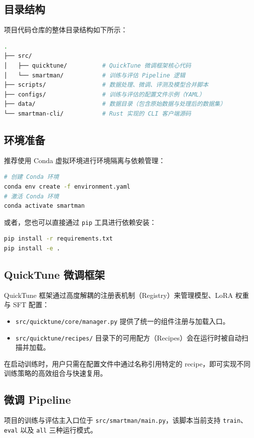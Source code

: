 \documentclass[UTF8,a4paper,12pt]{ctexart}
\begin{document}
\subsection{目录结构}
项目代码仓库的整体目录结构如下所示：
\newpage
\begin{lstlisting}[language=bash, numbers=none, caption=项目目录树结构]
.
├── src/
│   ├── quicktune/          # QuickTune 微调框架核心代码
│   └── smartman/           # 训练与评估 Pipeline 逻辑
├── scripts/                # 数据处理、微调、评测及模型合并脚本
├── configs/                # 训练与评估的配置文件示例（YAML）
├── data/                   # 数据目录（包含原始数据与处理后的数据集）
└── smartman-cli/           # Rust 实现的 CLI 客户端源码
\end{lstlisting}

\subsection{环境准备}
推荐使用 Conda 虚拟环境进行环境隔离与依赖管理：

\begin{lstlisting}[language=bash]
# 创建 Conda 环境
conda env create -f environment.yaml
# 激活 Conda 环境
conda activate smartman
\end{lstlisting}

或者，您也可以直接通过 \texttt{pip} 工具进行依赖安装：

\begin{lstlisting}[language=bash]
pip install -r requirements.txt
pip install -e .
\end{lstlisting}

\subsection{QuickTune 微调框架}
QuickTune 框架通过高度解耦的注册表机制（Registry）来管理模型、LoRA 权重与 SFT 配置：
\begin{itemize}
    \item \texttt{src/quicktune/core/manager.py} 提供了统一的组件注册与加载入口。
    \item \texttt{src/quicktune/recipes/} 目录下的可用配方（Recipes）会在运行时被自动扫描并加载。
\end{itemize}
在启动训练时，用户只需在配置文件中通过名称引用特定的 recipe，即可实现不同训练策略的高效组合与快速复用。

\subsection{微调 Pipeline}
项目的训练与评估主入口位于 \texttt{src/smartman/main.py}，该脚本当前支持 \texttt{train}、\texttt{eval} 以及 \texttt{all} 三种运行模式。
\end{document}
